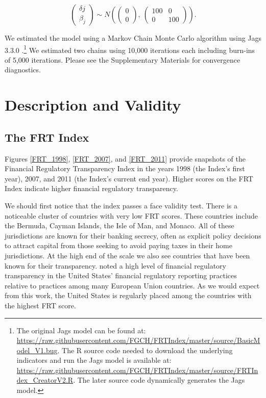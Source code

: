 \documentclass[a4paper]{article}
\begin{document}
\begin{equation}
    \begin{pmatrix}
      \delta{j} \\
      \beta_{j}
    \end{pmatrix} 
    \sim N 
    \left(
        \begin{pmatrix} 
            0 \\
            0 
        \end{pmatrix}
            ,\:
        \begin{pmatrix} 
            100 & 0 \\
            0 & 100
        \end{pmatrix}
    \right). 
\end{equation}

We estimated the model using a Markov Chain Monte Carlo algorithm using Jags 3.3.0 \citep{Plummer2003}.\footnote{The original Jags model can be found at: \url{https://raw.githubusercontent.com/FGCH/FRTIndex/master/source/BasicModel_V1.bug}. The R \citep{RCite} source code needed to download the underlying indicators and run the Jags model is available at: \url{https://raw.githubusercontent.com/FGCH/FRTIndex/master/source/FRTIndex_CreatorV2.R}. The later source code dynamically generates the Jags model.} We estimated two chains using 10,000 iterations each including burn-ins of 5,000 iterations. Please see the Supplementary Materials for convergence diagnostics. 


\section{Description and Validity}


\subsection{The FRT Index}

Figures \ref{FRT_1998}, \ref{FRT_2007}, and \ref{FRT_2011} provide snapshots of the Financial Regulatory Transparency Index in the years 1998 (the Index's first year), 2007, and 2011 (the Index's current end year). Higher scores on the FRT Index indicate higher financial regulatory transparency.

We should first notice that the index passes a face validity test. There is a noticeable cluster of countries with very low FRT scores. These countries include the Bermuda, Cayman Islands, the Isle of Man, and Monaco. All of these jurisdictions are known for their banking secrecy, often as explicit policy decisions to attract capital from those seeking to avoid paying taxes in their home jurisdictions. At the high end of the scale we also see countries that have been known for their transparency. \cite{Gandrud2014a} noted a high level of financial regulatory transparency in the United States' financial regulatory reporting practices relative to practices among many European Union countries. As we would expect from this work, the United States is regularly placed among the countries with the highest FRT score.  
\end{document}

